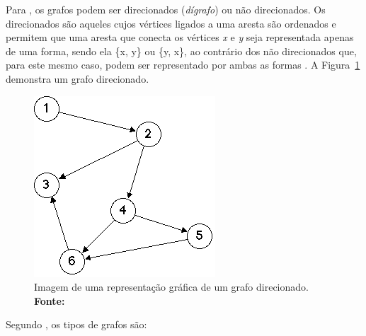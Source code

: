 \newpage

\par Para , os grafos podem ser direcionados (\textit{dígrafo}) ou não direcionados. Os  direcionados são aqueles cujos vértices ligados a uma aresta são ordenados e permitem que uma aresta que conecta os vértices \textit{x} e \textit{y} seja representada apenas de uma forma, sendo ela \{x, y\} ou \{y, x\}, ao contrário dos não direcionados que, para este mesmo caso, podem ser representado por ambas as formas \cite{rocha_algoritmos_particionamento_banco_dados_orientado_grafos}. A Figura~\ref{fig:ilustracao_grafo_direcionado} demonstra um grafo direcionado.

\begin{figure}[h!]
	\centerline{\includegraphics[scale=0.6]{./imagens/simple_digraph_graph.png}}
	\caption[Imagem de uma representação gráfica de um grafo direcionado]
	{Imagem de uma representação gráfica de um grafo direcionado. \textbf{Fonte:} }
	\label{fig:ilustracao_grafo_direcionado}
\end{figure}

Segundo , os tipos de grafos são:

